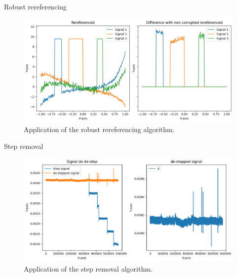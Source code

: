 \documentclass[10pt,serif]{beamer}
\begin{document}
\begin{frame}{Robust rereferencing}

    \begin{figure}
        \centering
        \includegraphics[width=.8\textwidth]{figures/rereferencing.png}
        \caption{Application of the robust rereferencing algorithm.}
        \label{fig:data}
    \end{figure}

\end{frame}

\begin{frame}{Step removal}
    \begin{figure}
        \centering
        \includegraphics[width=.8\textwidth]{figures/step_removal_real.png}
        \caption{Application of the step removal algorithm.}
        \label{fig:data}
    \end{figure}
\end{frame}
\end{document}
